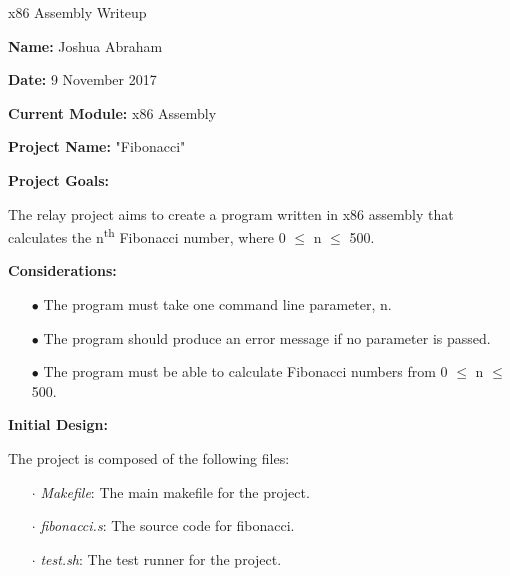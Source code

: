 \documentclass{article}
\begin{document}
\centerline{\sc \large x86 Assembly Writeup}
\vspace{.5pc}

\begin{flushleft}
\textbf{Name:} Joshua Abraham
\vspace{.5pc}

\textbf{Date:} 9 November 2017
\vspace{.5pc}

\textbf{Current Module:} x86 Assembly
\vspace{.5pc}

\textbf{Project Name:} "Fibonacci"
\vspace{.5pc}

\textbf{Project Goals:}
\vspace{.5pc}
\end{flushleft}

The relay project aims to create a program written in x86 assembly that calculates the 
n\textsuperscript{th} Fibonacci number, where 0 $\leq$ n $\leq$	500.
\vspace{.5pc}

\begin{flushleft}
\textbf{Considerations:}
\vspace{.5pc}
\end{flushleft}

\begin{itemize}
	\item[$\bullet$] The program must take one command line parameter, n.
	\item[$\bullet$] The program should produce an error message if no parameter is 
	passed.
	\item[$\bullet$] The program must be able to calculate Fibonacci numbers from 0 $\leq$ 
	n $\leq$ 500.
\end{itemize}
\vspace{.5pc}

\begin{flushleft}
\textbf{Initial Design:}
\vspace{.5pc}
\end{flushleft}

The project is composed of the following files:
\begin{itemize}
	\item [$\cdot$] \textit{Makefile}: The main makefile for the project.
	\item [$\cdot$] \textit{fibonacci.s}: The source code for fibonacci.
	\item [$\cdot$] \textit{test.sh}: The test runner for the project.
\end{itemize}
\vspace{2mm}
\end{document}
